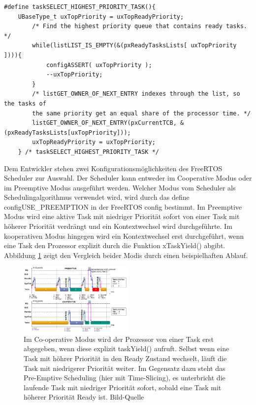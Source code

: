 \begin{lstlisting}[caption={FreeRTOS Source zur Priroty Task Selection aus Task.c. Alle lauffähigen Task werden in einem Array vewaltet pxReadyTaskLists. Die Listen verwalten sich durch Referenz-Pointer in den TCBs der einzelnen Tasks}, linewidth=8cm,captionpos=b, label=lst:nextTask, float=hbt]
#define taskSELECT_HIGHEST_PRIORITY_TASK(){																									
	UBaseType_t uxTopPriority = uxTopReadyPriority;														
		/* Find the highest priority queue that contains ready tasks. */								
		while(listLIST_IS_EMPTY(&(pxReadyTasksLists[ uxTopPriority ]))){																								
			configASSERT( uxTopPriority );																
			--uxTopPriority;																			
		}																								
		/* listGET_OWNER_OF_NEXT_ENTRY indexes through the list, so the tasks of						
		the	same priority get an equal share of the processor time. */									
		listGET_OWNER_OF_NEXT_ENTRY(pxCurrentTCB, &(pxReadyTasksLists[uxTopPriority]));			
		uxTopReadyPriority = uxTopPriority;																
	} /* taskSELECT_HIGHEST_PRIORITY_TASK */
\end{lstlisting}
\newline
Dem Entwickler stehen zwei Konfigurationsmöglichkeiten des FreeRTOS Scheduler zur Auswahl. Der Scheduler kann entweder im Cooperative Modus oder im Preemptive Modus ausgeführt werden. Welcher Modus vom Scheduler als Schedulingalgorithmus verwendet wird, wird durch das define configUSE\_PREEMPTION in der FreeRTOS config bestimmt. Im Preemptive Modus wird eine aktive Task mit niedriger Priorität sofort von einer Task mit höherer Priorität verdrängt und ein Kontextwechsel wird durchgeführte. Im kooperativen Modus hingegen wird ein Kontextwechsel erst durchgeführt, wenn eine Task den Prozessor explizit durch die Funktion xTaskYield() abgibt. Abbildung \ref{fig:PreVSCo} zeigt den Vergleich beider Modis durch einen beispielhaften Ablauf. 
\begin{figure}[htb]
	\centering
		\includegraphics[width=0.5\textwidth]{Pictures/EMCUIT/PreemptiveCooperative.png}
	\caption{Im Co-operative Modus wird der Prozessor von einer Task erst abgegeben, wenn diese explizit taskYield() aufruft. Selbst wenn eine Task mit höhrer Priorität in den Ready Zustand wechselt, läuft die Task mit niedrigerer Priorität weiter. Im Gegensatz dazu steht das Pre-Emptive Scheduling (hier mit Time-Slicing), es unterbricht die laufende Task mit niedriger Priorität sofort, sobald eine Task mit höherer Priorität Ready ist. Bild-Quelle~\protect{}}
	\label{fig:PreVSCo}
\end{figure}

